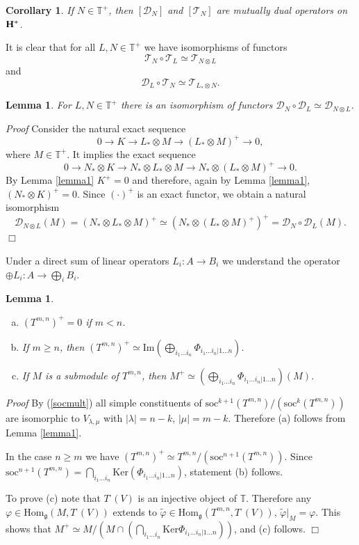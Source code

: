 \documentclass[11pt]{amsart}
\newcounter{theorem}
\newtheorem{lemma}[theo]{Lemma}
\newtheorem{corollary}[theo]{Corollary}
\renewenvironment{proof}{ \emph{Proof}}{$\Box$}
\newcommand{\TT}{\mathbb{T}}
\renewcommand{\gg}{\mathfrak{g}}
\renewcommand {\phi} {\varphi}
\newcommand{\refle}[1]{Lemma \ref{#1}}
\renewcommand{\Im}{\mathrm{Im}}
\newcommand{\soc}{\mathrm{soc}}
\newcommand{\Ker}{\mathrm{Ker}}
\newcommand{\Hom}{\mathrm{Hom}}
\begin{document}
\begin{corollary}\label{coradj} If $N\in\TT^+$, then $[\mathcal D_N]$ and $[\mathcal T_N]$ are mutually dual operators on $\bold{H}^+$.
\end{corollary}

It is clear that for all $L,N\in\TT^+$ we have isomorphisms of functors
$$\mathcal T_N\circ\mathcal T_L\simeq \mathcal T_{N\otimes L}$$
and 
$$\mathcal D_L\circ \mathcal T_N\simeq \mathcal T_{L_*\otimes N}.$$

\begin{lemma}\label{lemma3} For $L,N\in\mathbb T^+$ there is an isomorphism of functors 
$\mathcal D_N\circ \mathcal D_L\simeq \mathcal D_{N\otimes L}$.
\end{lemma}

\begin{proof}
Consider the natural exact sequence
$$0\rightarrow K\rightarrow L_*\otimes M\rightarrow(L_*\otimes M)^+\rightarrow 0,$$
where $M\in\mathbb T^+$.
It implies the exact sequence
$$0\rightarrow N_*\otimes K\rightarrow N_*\otimes L_*\otimes M\rightarrow N_*\otimes(L_*\otimes M)^+\rightarrow 0.$$
By \refle{lemma1} $K^+=0$ and therefore, again by \refle{lemma1}, $(N_*\otimes K)^+=0$.
Since $(\cdot)^+$ is an exact functor, we obtain a natural isomorphism
$$ \mathcal D_{N\otimes L}(M)=(N_*\otimes L_*\otimes M)^+\simeq(N_*\otimes(L_*\otimes M)^+)^+=\mathcal D_N\circ \mathcal D_L(M).$$
\end{proof}



Under a direct sum of linear operators $L_i: A\rightarrow B_i$ we understand the operator
$\oplus L_i:A\rightarrow\bigoplus_i B_i.$

\begin{lemma}\label{lemma4}
\begin{enumerate}[(a)]
 \item $(T^{m,n})^+=0$ if $m<n$.
 \item If $m\geq n$, then $(T^{m,n})^+\simeq\Im\left(\bigoplus_{i_1...i_n}\Phi_{i_1...i_n|1...n}\right)$.
 \item If $M$ is a submodule of $T^{m,n}$, then $M^+\simeq\left(\bigoplus_{i_1...i_n}\Phi_{i_1...i_n|1...n}\right)(M)$.
\end{enumerate}
\end{lemma}

\begin{proof}
By (\ref{socmult}) all simple constituents of $\soc^{k+1}(T^{m,n})/(\soc^{k}(T^{m,n}))$ are isomorphic to
$V_{\lambda,\mu}$ with $|\lambda|=n-k$, $|\mu|=m-k$. Therefore (a) follows from
\refle{lemma1}. 

In the case $n\geq m$ we have $(T^{m,n})^+\simeq T^{m,n}/(\soc^{n+1}(T^{m,n}))$.
Since $\soc^{n+1}(T^{m,n})=\bigcap_{i_1...i_n}\Ker(\Phi_{i_1...i_n|1...n})$, statement (b) follows. 

To prove (c) note that $T^\cdot(V)$ is an injective object of $\mathbb T$. Therefore 
any $\phi\in\Hom_\gg(M,T^\cdot(V))$ extends to $\tilde{\phi}\in\Hom_\gg(T^{m,n},T^\cdot(V))$,
$\tilde{\phi}|_M=\phi$. This shows that $\displaystyle M^+\simeq M/(M\cap(\bigcap_{i_1\dots i_n}\Ker\Phi_{i_1...i_n|1...n}))$,
and (c) follows.
\end{proof}
\end{document}

